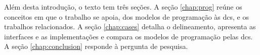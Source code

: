 Além desta introdução, o texto tem três seções.
A seção \ref{chap:prog} reúne os conceitos em que o trabalho se apoia, dos
modelos de programação às \glspl{dc}, e os trabalhos relacionados.
A seção \ref{chap:cases} detalha o delineamento, apresenta as interfaces e as
implementações e compara os modelos de programação pelas \glspl{dc}.
A seção \ref{chap:conclusion} responde à pergunta de pesquisa.
